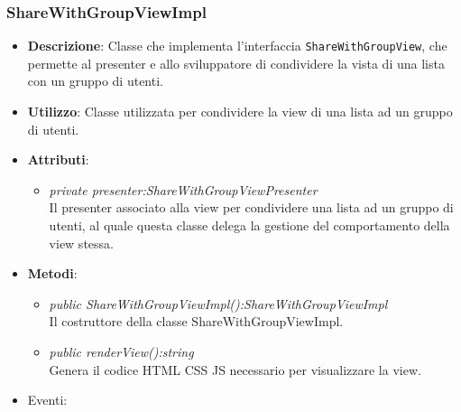 \begin{itemize}
\subsubsection{ShareWithGroupViewImpl}
\begin{itemize}
\item \textbf{Descrizione}: Classe che implementa l'interfaccia \texttt{ShareWithGroupView}, che permette al presenter e allo sviluppatore di condividere la vista di una lista con un gruppo di utenti.
\item \textbf{Utilizzo}: Classe utilizzata per condividere la view di una lista ad un gruppo di utenti.
\item \textbf{Attributi}:
	\begin{itemize}
	\item \textit{private presenter:ShareWithGroupViewPresenter}\\
	Il presenter associato alla view per condividere una lista ad un gruppo di utenti, al quale questa classe delega la gestione del comportamento della view stessa.
	\end{itemize} 
\item \textbf{Metodi}:
	\begin{itemize}
	\item \textit{public ShareWithGroupViewImpl():ShareWithGroupViewImpl}\\
	Il costruttore della classe ShareWithGroupViewImpl.
	\item \textit{public renderView():string}\\
		Genera il codice HTML CSS JS necessario per visualizzare la view.
	\end{itemize}
\item{Eventi}:
\end{itemize}


\end{itemize}
